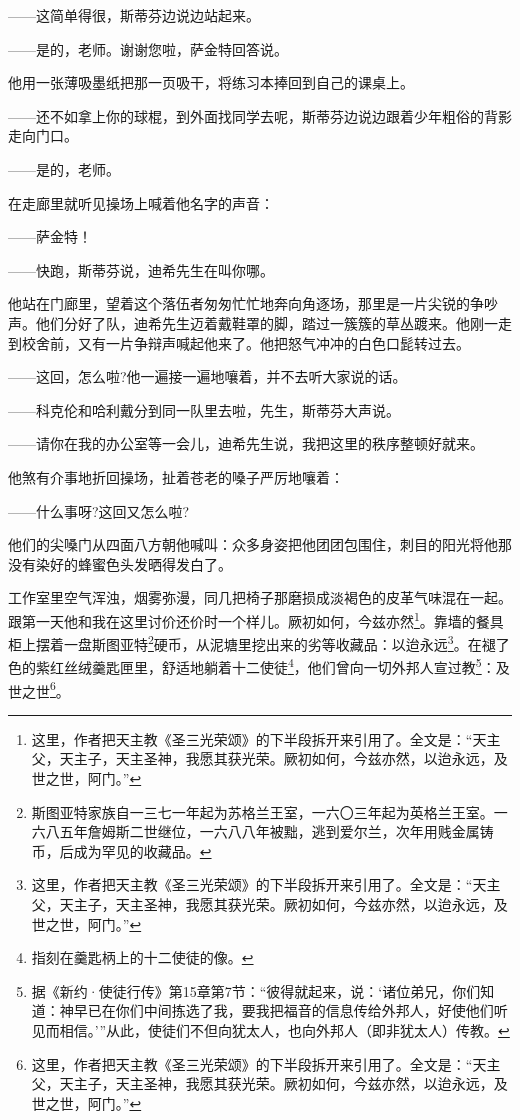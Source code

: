 \par ——这简单得很，斯蒂芬边说边站起来。
\par ——是的，老师。谢谢您啦，萨金特回答说。
\par 他用一张薄吸墨纸把那一页吸干，将练习本捧回到自己的课桌上。
\par ——还不如拿上你的球棍，到外面找同学去呢，斯蒂芬边说边跟着少年粗俗的背影走向门口。
\par ——是的，老师。
\par 在走廊里就听见操场上喊着他名字的声音：
\par ——萨金特！
\par ——快跑，斯蒂芬说，迪希先生在叫你哪。
\par 他站在门廊里，望着这个落伍者匆匆忙忙地奔向角逐场，那里是一片尖锐的争吵声。他们分好了队，迪希先生迈着戴鞋罩的脚，踏过一簇簇的草丛踱来。他刚一走到校舍前，又有一片争辩声喊起他来了。他把怒气冲冲的白色口髭转过去。
\par ——这回，怎么啦?他一遍接一遍地嚷着，并不去听大家说的话。
\par ——科克伦和哈利戴分到同一队里去啦，先生，斯蒂芬大声说。
\par ——请你在我的办公室等一会儿，迪希先生说，我把这里的秩序整顿好就来。
\par 他煞有介事地折回操场，扯着苍老的嗓子严厉地嚷着：
\par ——什么事呀?这回又怎么啦?
\par 他们的尖嗓门从四面八方朝他喊叫：众多身姿把他团团包围住，刺目的阳光将他那没有染好的蜂蜜色头发晒得发白了。
\par 工作室里空气浑浊，烟雾弥漫，同几把椅子那磨损成淡褐色的皮革气味混在一起。跟第一天他和我在这里讨价还价时一个样儿。厥初如何，今兹亦然\footnote{这里，作者把天主教《圣三光荣颂》的下半段拆开来引用了。全文是：“天主父，天主子，天主圣神，我愿其获光荣。厥初如何，今兹亦然，以迨永远，及世之世，阿门。”}。靠墙的餐具柜上摆着一盘斯图亚特\footnote{斯图亚特家族自一三七一年起为苏格兰王室，一六〇三年起为英格兰王室。一六八五年詹姆斯二世继位，一六八八年被黜，逃到爱尔兰，次年用贱金属铸币，后成为罕见的收藏品。}硬币，从泥塘里挖出来的劣等收藏品：以迨永远\footnote{这里，作者把天主教《圣三光荣颂》的下半段拆开来引用了。全文是：“天主父，天主子，天主圣神，我愿其获光荣。厥初如何，今兹亦然，以迨永远，及世之世，阿门。”}。在褪了色的紫红丝绒羹匙匣里，舒适地躺着十二使徒\footnote{指刻在羹匙柄上的十二使徒的像。}，他们曾向一切外邦人宣过教\footnote{据《新约·使徒行传》第15章第7节：“彼得就起来，说：‘诸位弟兄，你们知道：神早已在你们中间拣选了我，要我把福音的信息传给外邦人，好使他们听见而相信。’”从此，使徒们不但向犹太人，也向外邦人（即非犹太人）传教。}：及世之世\footnote{这里，作者把天主教《圣三光荣颂》的下半段拆开来引用了。全文是：“天主父，天主子，天主圣神，我愿其获光荣。厥初如何，今兹亦然，以迨永远，及世之世，阿门。”}。
